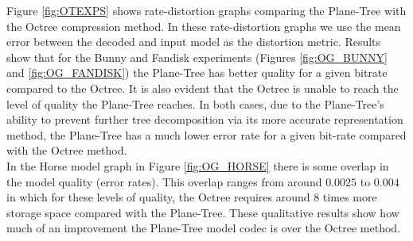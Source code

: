 Figure \ref{fig:OTEXPS} shows rate-distortion graphs comparing the Plane-Tree with the Octree compression method. In these rate-distortion graphs we use the mean error between the decoded and input model as the distortion metric. Results show that for the Bunny and Fandisk experiments (Figures \ref{fig:OG_BUNNY} and \ref{fig:OG_FANDISK}) the Plane-Tree has better quality for a given bitrate compared to the Octree. It is also evident that the Octree is unable to reach the level of quality the Plane-Tree reaches. In both cases, due to the Plane-Tree's ability to prevent further tree decomposition via its more accurate representation method, the Plane-Tree has a much lower error rate for a given bit-rate compared with the Octree method. \\

In the Horse model graph in Figure \ref{fig:OG_HORSE} there is some overlap in the model quality (error rates). This overlap ranges from around $0.0025$ to $0.004$ in which for these levels of quality, the Octree requires around 8 times more storage space compared with the Plane-Tree. These qualitative results show how much of an improvement the Plane-Tree model codec is over the Octree method. \\

